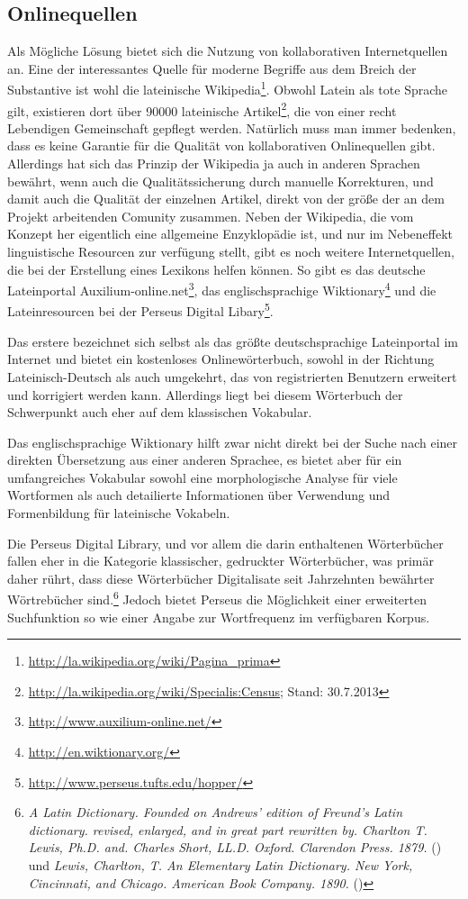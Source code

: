 \documentclass[12pt,abstract=on,titlepage,bibliography=totoc,ngerman,listof=totoc]{scrreprt}
\begin{document}
\subsection{Onlinequellen}
\label{subsec:online}
Als Mögliche Lösung bietet sich die Nutzung von kollaborativen Internetquellen an. Eine der interessantes Quelle für moderne Begriffe aus dem Breich der Substantive ist wohl die lateinische Wikipedia\footnote{\url{http://la.wikipedia.org/wiki/Pagina\_prima}}. Obwohl Latein als tote Sprache gilt, existieren dort über 90000 lateinische Artikel\footnote{\url{http://la.wikipedia.org/wiki/Specialis:Census}; Stand: 30.7.2013}, die von einer recht Lebendigen Gemeinschaft gepflegt werden. Natürlich muss man immer bedenken, dass es keine Garantie für die Qualität von kollaborativen Onlinequellen gibt. Allerdings hat sich das Prinzip der Wikipedia ja auch in anderen Sprachen bewährt, wenn auch die Qualitätssicherung durch manuelle Korrekturen, und damit auch die Qualität der einzelnen Artikel, direkt von der größe der an dem Projekt arbeitenden Comunity zusammen. Neben der Wikipedia, die vom Konzept her eigentlich eine allgemeine Enzyklopädie ist, und nur im Nebeneffekt linguistische Resourcen zur verfügung stellt, gibt es noch weitere Internetquellen, die bei der Erstellung eines Lexikons helfen können. So gibt es das deutsche Lateinportal Auxilium-online.net\footnote{\url{http://www.auxilium-online.net/}}, das englischsprachige Wiktionary\footnote{\url{http://en.wiktionary.org/}} und die Lateinresourcen bei der Perseus Digital Libary\footnote{\url{http://www.perseus.tufts.edu/hopper/}}. \par
Das erstere bezeichnet sich selbst als das größte deutschsprachige Lateinportal im Internet und bietet ein kostenloses Onlinewörterbuch, sowohl in der Richtung Lateinisch-Deutsch als auch umgekehrt, das von registrierten Benutzern erweitert und korrigiert werden kann. Allerdings liegt bei diesem Wörterbuch der Schwerpunkt auch eher auf dem klassischen Vokabular. \par
Das englischsprachige Wiktionary hilft zwar nicht direkt bei der Suche nach einer direkten Übersetzung aus einer anderen Sprachee, es bietet aber für ein umfangreiches Vokabular sowohl eine morphologische Analyse für viele Wortformen als auch detailierte Informationen über Verwendung und Formenbildung für lateinische Vokabeln. \par
Die Perseus Digital Library, und vor allem die darin enthaltenen Wörterbücher fallen eher in die Kategorie klassischer, gedruckter Wörterbücher, was primär daher rührt, dass diese Wörterbücher Digitalisate seit Jahrzehnten bewährter Wörtrebücher sind.\footnote{\textit{A Latin Dictionary. Founded on Andrews' edition of Freund's Latin dictionary. revised, enlarged, and in great part rewritten by. Charlton T. Lewis, Ph.D. and. Charles Short, LL.D. Oxford. Clarendon Press. 1879.} (\persalatin) und \textit{Lewis, Charlton, T. An Elementary Latin Dictionary. New York, Cincinnati, and Chicago. American Book Company. 1890.} (\perselemlat)} Jedoch bietet Perseus die Möglichkeit einer erweiterten Suchfunktion so wie einer Angabe zur Wortfrequenz im verfügbaren Korpus. \par
\end{document}

